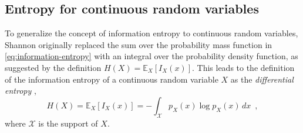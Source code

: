 \subsection{Entropy for continuous random variables}
To generalize the concept of information entropy to continuous random variables, Shannon originally replaced the sum over the probability mass function in \eqref{eq:information-entropy} with an integral over the probability density function, as suggested by the definition $H(X) = \mathbb{E}_X\left[I_X(x)\right]$. This leads to the definition of the information entropy of a continuous random variable $X$ as the \emph{differential entropy} \cite{shannon_mathematical_1948}, 
%
\begin{equation} \label{eq:differential-entropy}
    H(X) = \mathbb{E}_X\left[I_X(x)\right] = - \int_{\mathcal{X}} p_X(x) \log p_X(x) \, dx \enspace ,
\end{equation}
%
where $\mathcal{X}$ is the support of $X$. 

